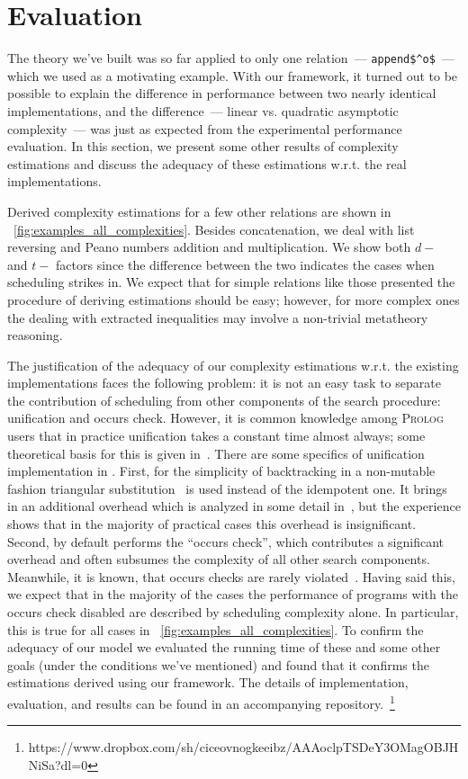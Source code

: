 \section{Evaluation}
\label{sec:evaluation}

The theory we've built was so far applied to only one relation~--- \lstinline|append$^o$|~--- which we used as a motivating example. With our framework, it turned out
to be possible to explain the difference in performance between two nearly identical implementations, and the difference~--- linear vs. quadratic asymptotic
complexity~--- was just as expected from the experimental performance evaluation. In this section, we present some other results of complexity estimations and
discuss the adequacy of these estimations w.r.t. the real \mK implementations.

Derived complexity estimations for a few other relations are shown in \figureword~\ref{fig:examples_all_complexities}. Besides concatenation, we deal with
list reversing and Peano numbers addition and multiplication. We show both $d-$ and $t-$ factors since the difference between the two indicates the
cases when scheduling strikes in. We expect that for simple relations like those presented the procedure of deriving estimations should be easy; however,
for more complex ones the dealing with extracted inequalities may involve a non-trivial metatheory reasoning.

The justification of the adequacy of our complexity estimations w.r.t. the existing \mK implementations faces the following problem: it is
not an easy task to separate the contribution of scheduling from other components of the search procedure: unification and occurs check. However, it is common
knowledge among \textsc{Prolog} users that in practice unification takes a constant time almost always; some theoretical basis for this is given in~\cite{UnificationAverageCost}.
There are some specifics of unification implementation in \mK. First, for the simplicity of backtracking in a non-mutable fashion triangular
substitution~\cite{UnificationTheory} is used instead of the idempotent one. It brings in an additional overhead which is analyzed
in some detail in~\cite{WillsThesis}, but the experience shows that in the majority of practical cases this overhead is insignificant. Second, \mK by default
performs the ``occurs check'', which contributes a significant overhead and often subsumes the complexity of all other search components. Meanwhile, it is known, that occurs checks are rarely
violated~\cite{OccursCheckNotAProblem}. Having said this, we expect that in the majority of the cases the performance of \mK programs with the occurs check disabled are
described by scheduling complexity alone. In particular, this is true for all cases in \figureword~\ref{fig:examples_all_complexities}. To confirm the adequacy of
our model we evaluated the running time of these and some other goals (under the conditions we've mentioned) and found that it confirms the estimations derived
using our framework. The details of implementation, evaluation, and results can be found in an accompanying repository.~\footnote{https://www.dropbox.com/sh/ciceovnogkeeibz/AAAoclpTSDeY3OMagOBJHNiSa?dl=0}

